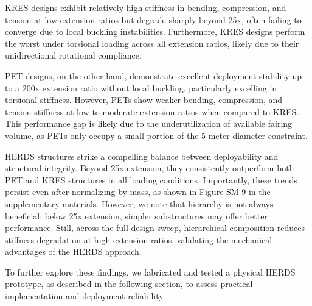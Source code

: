 {KRES designs exhibit relatively high stiffness in bending, compression, and tension at low extension ratios but degrade sharply beyond 25x, often failing to converge due to local buckling instabilities. Furthermore, KRES designs perform the worst under torsional loading across all extension ratios, likely due to their unidirectional rotational compliance.}

{PET designs, on the other hand, demonstrate excellent deployment stability up to a 200x extension ratio without local buckling, particularly excelling in torsional stiffness. However, PETs show weaker bending, compression, and tension stiffness at low-to-moderate extension ratios when compared to KRES. This performance gap is likely due to the underutilization of available fairing volume, as PETs only occupy a small portion of the 5-meter diameter constraint.}

{HERDS structures strike a compelling balance between deployability and structural integrity. Beyond 25x extension, they consistently outperform both PET and KRES structures in all loading conditions. Importantly, these trends persist even after normalizing by mass, as shown in Figure SM 9 in the supplementary materials. However, we note that hierarchy is not always beneficial: below 25x extension, simpler substructures may offer better performance. Still, across the full design sweep, hierarchical composition reduces stiffness degradation at high extension ratios, validating the mechanical advantages of the HERDS approach.}

{To further explore these findings, we fabricated and tested a physical HERDS prototype, as described in the following section, to assess practical implementation and deployment reliability.}

